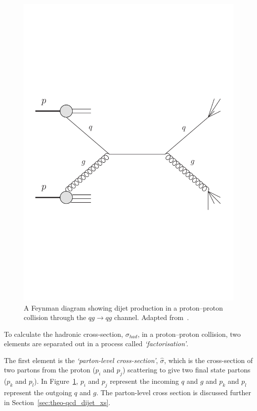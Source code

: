 \begin{figure}[!hbt]
\vspace{-1em}
  \begin{center}
    \includegraphics[width=0.65\linewidth, angle=0]{figs/Theory/qcd_dijet_feynman.pdf}
  \end{center}
  \vspace{-1em}
  \caption[A Feynman diagram showing dijet production in a proton--proton collision through the $qg \to qg$ channel.]
          {A Feynman diagram showing dijet production in a proton--proton collision through the $qg \to qg$ channel. Adapted from~\cite{theo-qcd_dijet_feynman}.}
          \label{fig:theo-qcd_dijet_feynman}
\vspace{-1em}
\end{figure}

To calculate the hadronic cross-section, $\sigma_{had}$, in a proton--proton collision,
two elements are separated out in a process called \textit{`factorisation'}.

The first element is the \textit{`parton-level cross-section'}, $\hat{\sigma}$, which is the cross-section of
two partons from the proton ($p_i$ and $p_j$) scattering to give two final state partons ($p_k$ and $p_l$).
In Figure~\ref{fig:theo-qcd_dijet_feynman}, $p_i$ and $p_j$ represent the incoming $q$ and $g$ and $p_k$ and $p_l$ represent the outgoing $q$ and $g$.
The parton-level cross section is discussed further in Section~\ref{sec:theo-qcd_dijet_xs}.

